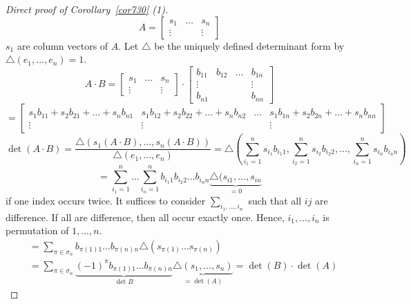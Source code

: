 \documentclass{article}
\begin{document}
\begin{proof}[Direct proof of Corollary~\ref{cor730} (1)]
  \[ A = \begin{bmatrix} s_1 & \dots & s_n \\ \vdots &  & \vdots \end{bmatrix} \]
  $s_1$ are column vectors of $A$.
  Let $\triangle$ be the uniquely defined determinant form by $\triangle(e_1, \dots, e_n) = 1$.
  \[
  	A \cdot B
  	= \begin{bmatrix} s_1 & \dots & s_n \\ \vdots &  & \vdots \end{bmatrix} \cdot \begin{bmatrix} b_{11} & b_{12} & \dots & b_{1n} \\ \vdots & & & \vdots \\ b_{n1} & & & b_{nn} \end{bmatrix}
  \] \[
  	= \begin{bmatrix} s_1 b_{11} + s_2 b_{21} + \dots + s_n b_{n1} & s_1 b_{12} + s_2 b_{22} + \dots + s_n b_{n2} & \dots & s_1 b_{1n} + s_2 b_{2n} + \dots + s_n b_{nn} \\
  	\vdots & \vdots &  & \vdots \end{bmatrix}
  \] \[
  	\det(A \cdot B) = \frac{\triangle(s_1(A \cdot B), \dots, s_n(A \cdot B))}{\triangle (e_1, \dots, e_n)}
  	  = \triangle\left(\sum_{i_1=1}^n s_{i_1} b_{i_1 1}, \sum_{i_2=1}^n s_{i_2} b_{i_2 2}, \dots, \sum_{i_n=1}^n s_{i_n} b_{i_n n}\right)
  \] \[
    = \sum_{i_1=1}^n \dots \sum_{i_n=1}^n b_{i_1 1} b_{i_2 2} \dots b_{i_n n} \underbrace{\triangle(s_{i1}, \dots, s_{in}}_{=0}
  \]
  if one index occurs twice. It suffices to consider $\sum_{i_1,\dots,i_n}$ such that all $ij$ are difference.
  If all are difference, then all occur exactly once. Hence,
  $i_1,\dots,i_n$ is permutation of $1, \dots, n$.
  \begin{align*}
    &= \sum_{\pi \in \sigma_n} b_{\pi(1) 1} \dots b_{\pi(n) n} \triangle(s_{\pi(1)} \dots s_{\pi(n)}) \\
    &= \sum_{\pi \in \sigma_n} \underbrace{(-1)^\pi b_{\pi(1) 1} \dots b_{\pi(n) n}}_{\det{B}} \underbrace{\triangle(s_1, \dots, s_n)}_{= \det(A)} = \det(B) \cdot \det(A)
  \end{align*}
\end{proof}
\end{document}
